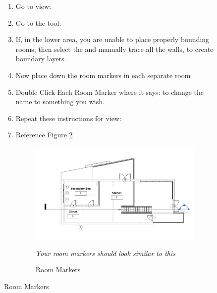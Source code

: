 \documentclass{tufte-book} %
\begin{document}
\begin{figure}
\begin{enumerate}

	\subsection{Creating Room Markers}
		\item Go to view: 
		\item Go to the tool: 
		\item If, in the lower area, you are unable to place properly bounding rooms, then select the  and manually trace all the walls, to create boundary layers.
		\item Now place down the room markers in each separate room
		\item Double Click Each Room Marker where it says:  to change the name to something you wish.
		\item Repeat these instructions for view: 
		\item Reference Figure \ref{fig:revroommarkers}
		
		\begin{figure}
			\includegraphics[width=\linewidth]{revitroommakers.png}
			\caption{Room Markers}
			\emph{Your room markers should look similar to this}
			\label{fig:revroommarkers}
		\end{figure}
		


\end{enumerate}
\end{figure}
\end{document}
